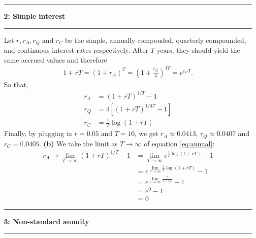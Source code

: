 \documentclass[11pt]{article}
\newcommand\question[2]{\vspace{.25in}\hrule\textbf{#1: #2}\vspace{.5em}\hrule\vspace{.10in}}
\renewcommand\part[1]{\vspace{.10in}\textbf{(#1)}}
\begin{document}
\question{2}{Simple interest} Let $r, r_A, r_Q$ and $r_C$ be the simple, annually compouded, quarterly compounded, and continuous interest rates respectively. After $T$ years, they should yield the same accrued values and therefore
\begin{align}
    1 + r T = (1 + r_A)^T = (1 +\frac{r_Q}{4})^{4T} = e^{r_C T} .
\end{align}
So that,
\begin{align}
    r_A &= (1 + r T)^{1/T} - 1 \label{eq:annual}\\
    r_Q &= 4\left[(1 + r T)^{1/4T} - 1\right]\\
    r_C &= \frac{1}{T}\log(1 + r T)
\end{align}
Finally, by plugging in $r=0.05$ and $T=10$, we get $r_A \approx 0.0413$, $r_Q \approx 0.0407$ and $r_C = 0.0405$.
\part{b} We take the limit as $T\to\infty$ of equation \eqref{eq:annual}:
\begin{align}
    r_A \to \lim_{T\to\infty} (1 + r T)^{1/T} - 1 &= \lim_{T\to\infty} e^{\frac{1}{T}\log(1 + r T)} - 1\nonumber \\
                                          &= e^{\lim_{T\to\infty}\frac{1}{T}\log(1 + r T)} - 1\nonumber \\
                                          &= e^{\lim_{T\to\infty}\frac{r}{1 + rT}} - 1\nonumber \\
                                          &= e^{0} - 1\nonumber \\
                                          &= 0
\end{align}

\question{3}{Non-standard annuity}
\end{document}
